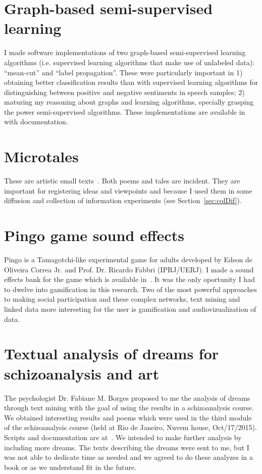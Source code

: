 \begin{apendicesenv}
\section{Graph-based semi-supervised learning}
I made software implementations of two graph-based semi-supervised learning algorithms
(i.e. supervised learning algorithms that make use of unlabeled data):
``mean-cut'' and ``label propagation''.
These were particularly important in 1) obtaining better classification results
than with supervised learning algorithms for distinguishing between positive
and negative sentiments in speech samples; 2) maturing my reasoning about graphs
and learning algorithms, specially grasping the power semi-supervised algorithms.
These implementations are available in~\cite{ssl} with documentation.

\section{Microtales}
These are artistic small texts~\cite{microcontos}.
Both poems and tales are incident.
They are important for registering ideas and viewpoints
and because I used them in some diffusion and collection of information experiments
(see Section~\ref{sec:colDif}).

\section{Pingo game sound effects}
Pingo is a Tamagotchi-like experimental game for adults
developed by Edson de Oliveira Correa Jr. and Prof. Dr. Ricardo Fabbri (IPRJ/UERJ).
I made a sound effects bank for the game which is available in~\cite{pingo}.
It was the only oportunity I had to dwelve into gamification in this research.
Two of the most powerful approaches to making social participation and
these complex networks, text mining and linked data more interesting for the
user is gamification and audiovizualization of data.

\section{Textual analysis of dreams for schizoanalysis and art}
The psychologist Dr. Fabiane M. Borges proposed to me the analysis of dreams through text mining
with the goal of using the results in a schizoanalysis course.
We obtained interesting results and poems which were used in
the third module of the schizoanalysis course (held at Rio de Janeiro,
Nuvem house, Oct/17/2015).
Scripts and documentation are at~\cite{sonhos}.
We intended to make further analysis by including more dreams.
The texts describing the dreams were sent to me, but I was not able to dedicate time
as needed and we agreed to do these analyzes in a book or
as we understand fit in the future.


\end{apendicesenv}
